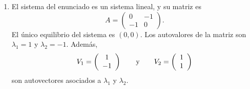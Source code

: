 \documentclass[11pt]{report}
\begin{document}
\begin{solution}
    \hfill
    \begin{enumerate}
        \item El sistema del enunciado es un sistema lineal, y su matriz es
        \[A = \left(\begin{array}{cc}
            0 & -1 \\
            -1 & 0
        \end{array}\right).\]
        El único equilibrio del sistema es $(0,0)$. Los autovalores de la matriz son $\lambda_1 = 1$ y $\lambda_2 = -1$. Además,
        \[V_1=\left(\begin{array}{c}
            1 \\
            -1
        \end{array}\right) \qquad \textup{y} \qquad V_2=\left(\begin{array}{c}
            1 \\
            1
        \end{array}\right)\]
        son autovectores asociados a $\lambda_1$ y $\lambda_2$.
        

\end{enumerate}
\end{solution}
\end{document}
